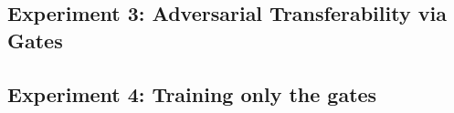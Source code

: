 \subsection{Experiment 3: Adversarial Transferability via Gates}


\subsection{Experiment 4: Training only the gates}


